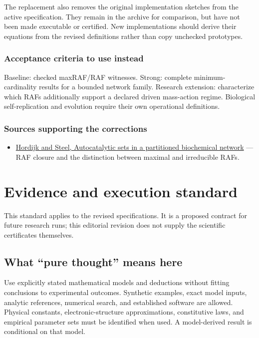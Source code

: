 \documentclass[
  11pt,
]{article}
\providecommand{\tightlist}{%
  \setlength{\itemsep}{0pt}\setlength{\parskip}{0pt}}
\begin{document}
The replacement also removes the original implementation sketches from
the active specification. They remain in the archive for comparison, but
have not been made executable or certified. New implementations should
derive their equations from the revised definitions rather than copy
unchecked prototypes.

\subsubsection{Acceptance criteria to use instead}

Baseline: checked maxRAF/RAF witnesses. Strong: complete
minimum-cardinality results for a bounded network family. Research
extension: characterize which RAFs additionally support a declared
driven mass-action regime. Biological self-replication and evolution
require their own operational definitions.

\subsubsection{Sources supporting the corrections}

\begin{itemize}
\tightlist
\item
  \href{https://pmc.ncbi.nlm.nih.gov/articles/PMC4034171/}{Hordijk and
  Steel, Autocatalytic sets in a partitioned biochemical network} ---
  RAF closure and the distinction between maximal and irreducible RAFs.
\end{itemize}

\section{Evidence and execution standard}

This standard applies to the revised specifications. It is a proposed
contract for future research runs; this editorial revision does not
supply the scientific certificates themselves.

\subsection{What ``pure thought'' means here}

Use explicitly stated mathematical models and deductions without fitting
conclusions to experimental outcomes. Synthetic examples, exact model
inputs, analytic references, numerical search, and established software
are allowed. Physical constants, electronic-structure approximations,
constitutive laws, and empirical parameter sets must be identified when
used. A model-derived result is conditional on that model.
\end{document}
